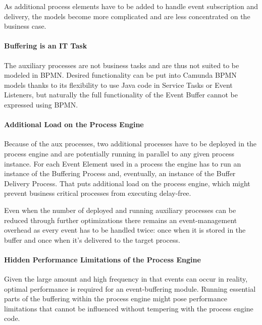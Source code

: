 As additional process elements have to be added to handle event subscription and delivery, the models become more complicated and are less concentrated on the business case.

\paragraph{Buffering is an IT Task\newline}

The auxiliary processes are not business tasks and are thus not suited to be modeled in BPMN.
Desired functionality can be put into Camunda BPMN models thanks to its flexibility to use Java code in Service Tasks or Event Listeners, but naturally the full functionality of the Event Buffer cannot be expressed using BPMN.

\paragraph{Additional Load on the Process Engine\newline}

Because of the aux processes, two additional processes have to be deployed in the process engine and are potentially running in parallel to any given process instance. For each Event Element used in a process the engine has to run an instance of the Buffering Process and, eventually, an instance of the Buffer Delivery Process.
That puts additional load on the process engine, which might prevent business critical processes from executing delay-free.

Even when the number of deployed and running auxiliary processes can be reduced through further optimizations there remains an event-management overhead as every event has to be handled twice: once when it is stored in the buffer and once when it's delivered to the target process.

\paragraph{Hidden Performance Limitations of the Process Engine\newline}

Given the large amount and high frequency in that events can occur in reality, optimal performance is required for an event-buffering module.
Running essential parts of the buffering within the process engine might pose performance limitations that cannot be influenced without tempering with the process engine code.


